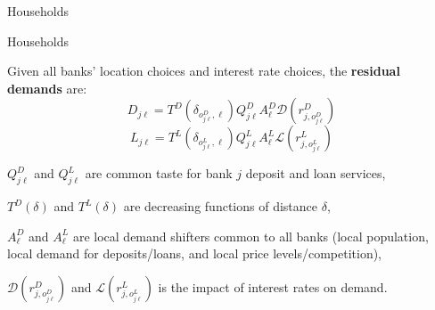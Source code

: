 \documentclass[notes,10pt, aspectratio=169]{beamer}
\newenvironment{wideitemize}{\itemize\addtolength{\itemsep}{10pt}}{\enditemize}
\begin{document}
\begin{frame}{Households}
\begin{wideitemize}

    \end{wideitemize}

\end{frame}

\begin{frame}{ Households}

    \begin{wideitemize}

        \item Given all banks' location choices and interest rate choices, the \textbf{residual demands} are:
        \begin{equation}D_{j \ell}=T^D\left(\delta_{o_{j \ell}^D, \ell}\right) Q_{j \ell}^D A_{\ell}^D \mathcal{D}\left(r_{j, o_{j \ell}^D}^D\right)
        \end{equation}
        \begin{equation} L_{j \ell}=T^L\left(\delta_{o_{j \ell}^L, \ell}\right) Q_{j \ell}^L A_{\ell}^L \mathcal{L}\left(r_{j, o_{j \ell}^L}^L\right) \end{equation}

        \begin{wideitemize}
            \item $Q_{j \ell}^D$ and $Q_{j \ell}^L$ are common taste for bank $j$ deposit and loan services,
            \item $T^D(\delta)$ and $T^L(\delta)$ are decreasing functions of distance $\delta$,
            \item $A_{\ell}^D$ and $A_{\ell}^L$ are local demand shifters common to all banks (local population, local demand for deposits/loans, and local price levels/competition), 
        
            \item $\mathcal{D}\left(r_{j, o_{j \ell}^D}^D\right)$ and $\mathcal{L}\left(r_{j, o_{j \ell}^L}^L\right)$ is the impact of interest rates on demand.
            

        \end{wideitemize}

    \end{wideitemize}


    \end{frame}
\end{document}
